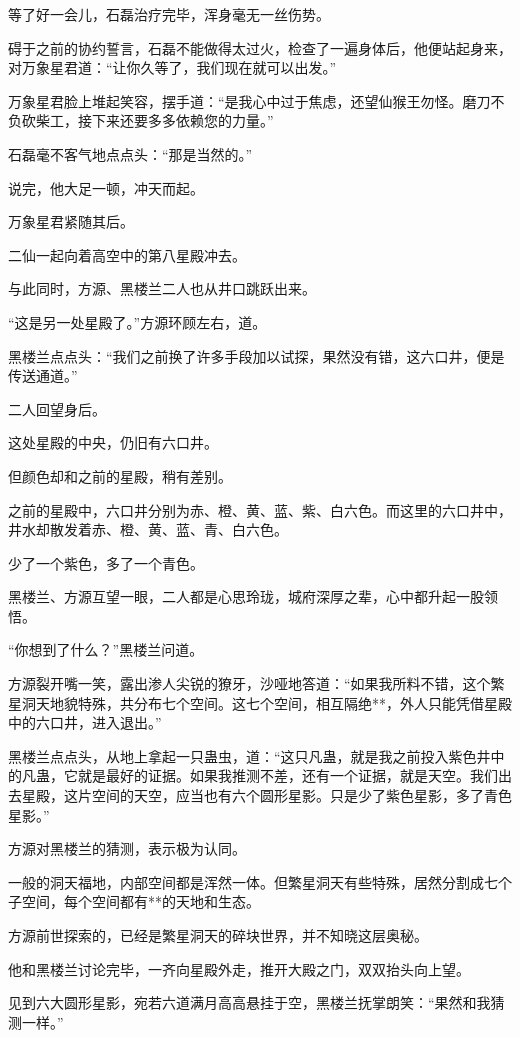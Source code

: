 \begin{this_body}
等了好一会儿，石磊治疗完毕，浑身毫无一丝伤势。

碍于之前的协约誓言，石磊不能做得太过火，检查了一遍身体后，他便站起身来，对万象星君道：“让你久等了，我们现在就可以出发。”

万象星君脸上堆起笑容，摆手道：“是我心中过于焦虑，还望仙猴王勿怪。磨刀不负砍柴工，接下来还要多多依赖您的力量。”

石磊毫不客气地点点头：“那是当然的。”

说完，他大足一顿，冲天而起。

万象星君紧随其后。

二仙一起向着高空中的第八星殿冲去。

与此同时，方源、黑楼兰二人也从井口跳跃出来。

“这是另一处星殿了。”方源环顾左右，道。

黑楼兰点点头：“我们之前换了许多手段加以试探，果然没有错，这六口井，便是传送通道。”

二人回望身后。

这处星殿的中央，仍旧有六口井。

但颜色却和之前的星殿，稍有差别。

之前的星殿中，六口井分别为赤、橙、黄、蓝、紫、白六色。而这里的六口井中，井水却散发着赤、橙、黄、蓝、青、白六色。

少了一个紫色，多了一个青色。

黑楼兰、方源互望一眼，二人都是心思玲珑，城府深厚之辈，心中都升起一股领悟。

“你想到了什么？”黑楼兰问道。

方源裂开嘴一笑，露出渗人尖锐的獠牙，沙哑地答道：“如果我所料不错，这个繁星洞天地貌特殊，共分布七个空间。这七个空间，相互隔绝**，外人只能凭借星殿中的六口井，进入退出。”

黑楼兰点点头，从地上拿起一只蛊虫，道：“这只凡蛊，就是我之前投入紫色井中的凡蛊，它就是最好的证据。如果我推测不差，还有一个证据，就是天空。我们出去星殿，这片空间的天空，应当也有六个圆形星影。只是少了紫色星影，多了青色星影。”

方源对黑楼兰的猜测，表示极为认同。

一般的洞天福地，内部空间都是浑然一体。但繁星洞天有些特殊，居然分割成七个子空间，每个空间都有**的天地和生态。

方源前世探索的，已经是繁星洞天的碎块世界，并不知晓这层奥秘。

他和黑楼兰讨论完毕，一齐向星殿外走，推开大殿之门，双双抬头向上望。

见到六大圆形星影，宛若六道满月高高悬挂于空，黑楼兰抚掌朗笑：“果然和我猜测一样。”


\end{this_body}
